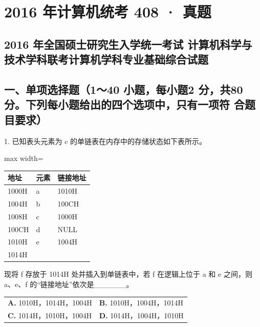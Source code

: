 \documentclass[UTF8,11pt]{ctexart}
\begin{document}
\section*{2016 年计算机统考 408 · 真题}
\subsection*{2016 年全国硕士研究生入学统一考试 计算机科学与技术学科联考计算机学科专业基础综合试题}

\subsection*{一、单项选择题（1～40 小题，每小题2 分，共80 分。下列每小题给出的四个选项中，只有一项符 合题目要求）}

1. 已知表头元素为 c 的单链表在内存中的存储状态如下表所示。


\begin{center}\begin{adjustbox}{max width=\linewidth}\begin{tabular}{|>{\raggedright\arraybackslash}p{\dimexpr(\linewidth-6\tabcolsep-4\arrayrulewidth)/3\relax}|>{\raggedright\arraybackslash}p{\dimexpr(\linewidth-6\tabcolsep-4\arrayrulewidth)/3\relax}|>{\raggedright\arraybackslash}p{\dimexpr(\linewidth-6\tabcolsep-4\arrayrulewidth)/3\relax}|}\hline
地址 & 元素 & 链接地址\\\hline
1000H & a & 1010H\\\hline
1004H & b & 100CH\\\hline
1008H & c & 1000H\\\hline
100CH & d & NULL\\\hline
1010H & e & 1004H\\\hline
1014H &  & \\\hline\end{tabular}\end{adjustbox}\end{center}

现将 f 存放于 1014H 处并插入到单链表中，若 f 在逻辑上位于 a 和 e 之间，则 a、e、f 的“链接地址”依次是\_\_\_\_\_\_。


\begin{center}\begin{tabular}{>{\raggedright\arraybackslash}p{\dimexpr(\linewidth-4\tabcolsep)/2\relax}>{\raggedright\arraybackslash}p{\dimexpr(\linewidth-4\tabcolsep)/2\relax}}
\textbf{A.} 1010H，1014H，1004H & \textbf{B.} 1010H，1004H，1014H\\[.35em]
\textbf{C.} 1014H，1010H，1004H & \textbf{D.} 1014H，1004H，1010H\\[.35em]\end{tabular}\end{center}
\end{document}
